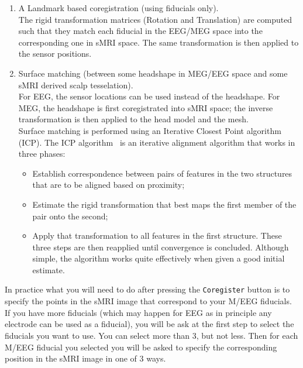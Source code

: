 \begin{enumerate}
    \item A Landmark based coregistration (using fiducials only).\\
    The rigid transformation matrices (Rotation and Translation) are computed such that they match each fiducial in the EEG/MEG space into the corresponding one in sMRI space. The same transformation is then applied to the sensor positions.
    \item Surface matching (between some headshape in MEG/EEG space and some sMRI derived scalp tesselation).\\
    For EEG, the sensor locations can be used instead of the headshape. For MEG, the headshape is first coregistrated into sMRI space; the inverse transformation is then applied to the head model and the mesh.\\
Surface matching is performed using an Iterative Closest Point algorithm (ICP). The ICP algorithm~\cite{Besl_McKay} is an iterative alignment algorithm that works in three phases:
\begin{itemize}
    \item Establish correspondence between pairs of features in the two structures that are to be aligned based on proximity;
    \item Estimate the rigid transformation that best maps the first member of the pair onto the second;
    \item Apply that transformation to all features in the first structure. These three steps are then reapplied until convergence is concluded. Although simple, the algorithm works quite effectively when given a good initial estimate.
\end{itemize}
\end{enumerate}

In practice what you will need to do after pressing  the \texttt{Coregister} button is to specify the points in the sMRI image that correspond to your M/EEG fiducials. If you have more fiducials (which may happen for EEG as in principle any electrode can be used as a fiducial), you will be ask at the first step to select the fiducials you want to use. You can select more than 3, but not less. Then for each M/EEG fiducial you selected you will be asked to specify the corresponding position in the sMRI image in one of 3 ways.

